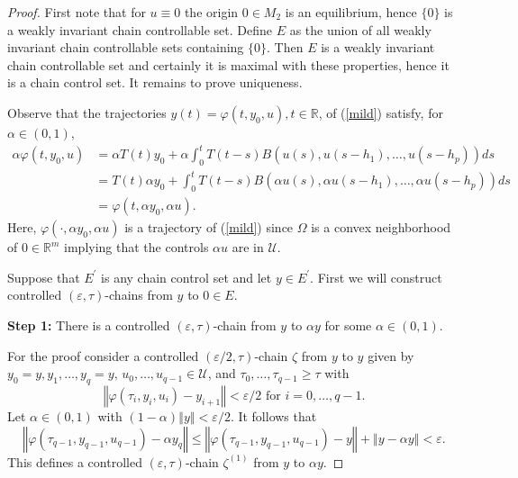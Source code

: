 \documentclass[10pt,a4paper]{amsart}
\begin{document}
\begin{proof}
First note that for $u\equiv0$ the origin $0\in M_{2}$ is an equilibrium,
hence $\{0\}$ is a weakly invariant chain controllable set. Define $E$ as the
union of all weakly invariant chain controllable sets containing $\{0\}$. Then
$E$ is a weakly invariant chain controllable set and certainly it is maximal
with these properties, hence it is a chain control set. It remains to prove uniqueness.

Observe that the trajectories $y(t)=\varphi(t,y_{0},u),t\in\mathbb{R}$, of
(\ref{mild}) satisfy, for $\alpha\in(0,1)$,%
\begin{align}
\alpha\varphi(t,y_{0},u)  &  =\alpha T(t)y_{0}+\alpha\int_{0}^{t}%
T(t-s)B\left(  u(s),u(s-h_{1}),\ldots,u(s-h_{p})\right)  ds\nonumber\\
&  =T(t)\alpha y_{0}+\int_{0}^{t}T(t-s)B\left(  \alpha u(s),\alpha
u(s-h_{1}),\ldots,\alpha u(s-h_{p})\right)  ds\nonumber\\
&  =\varphi(t,\alpha y_{0},\alpha u). \label{alpha1}%
\end{align}
Here, $\varphi(\cdot,\alpha y_{0},\alpha u)$ is a trajectory of (\ref{mild})
since $\Omega$ is a convex neighborhood of $0\in\mathbb{R}^{m}$ implying that
the controls $\alpha u$ are in $\mathcal{U}$.

Suppose that $E^{\prime}$ is any chain control set and let $y\in E^{\prime}$.
First we will construct controlled $(\varepsilon,\tau)$-chains from $y$ to
$0\in E$.

\textbf{Step 1:} There is a controlled $(\varepsilon,\tau)$-chain from $y$ to
$\alpha y$ for some $\alpha\in(0,1)$.

For the proof consider a controlled $(\varepsilon/2,\tau)$-chain $\zeta$ from
$y$ to $y$ given by $y_{0}=y,y_{1},\ldots,y_{q}=y,\,u_{0},\ldots,u_{q-1}%
\in\mathcal{U}$, and $\tau_{0},\ldots,\tau_{q-1}\geq\tau$ with%
\[
\left\Vert \varphi(\tau_{i},y_{i},u_{i})-y_{i+1}\right\Vert <\varepsilon
/2\text{ for }i=0,\ldots,q-1.
\]
Let $\alpha\in(0,1)$ with $(1-\alpha)\left\Vert y\right\Vert <\varepsilon/2$.
It follows that%
\[
\left\Vert \varphi(\tau_{q-1},y_{q-1},u_{q-1})-\alpha y_{q}\right\Vert
\leq\left\Vert \varphi(\tau_{q-1},y_{q-1},u_{q-1})-y\right\Vert +\left\Vert
y-\alpha y\right\Vert <\varepsilon.
\]
This defines a controlled $(\varepsilon,\tau)$-chain $\zeta^{(1)}$ from $y$ to
$\alpha y$.


\end{proof}
\end{document}
